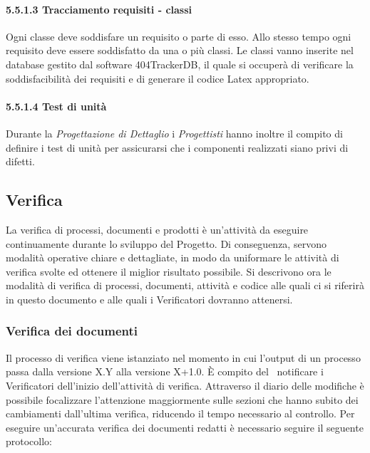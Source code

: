 \paragraph{5.5.1.3 Tracciamento requisiti - classi \\}
Ogni classe deve soddisfare un requisito o parte di esso. Allo stesso tempo ogni requisito deve essere soddisfatto da una o più classi.
Le classi vanno inserite nel database gestito dal software 404TrackerDB, il quale si occuperà di verificare la soddisfacibilità dei requisiti e di generare il codice {Latex} appropriato.

\paragraph{5.5.1.4 Test di unità \\}
Durante la \textit{Progettazione di Dettaglio} i \textit{Progettisti} hanno inoltre il compito di definire i test di unità per assicurarsi che i componenti realizzati siano privi di difetti.

\subsection{Verifica}

La verifica di processi, documenti e prodotti è un'attività da eseguire continuamente
durante lo sviluppo del Progetto. Di conseguenza, servono modalità operative chiare
e dettagliate, in modo da uniformare le attività di verifica svolte ed
ottenere il miglior risultato possibile. Si descrivono ora le modalità di verifica di processi, documenti, attività e codice alle quali ci si riferirà in questo
documento e alle quali i Verificatori dovranno attenersi.

\subsubsection{Verifica dei documenti}
Il processo di verifica viene istanziato nel momento in cui l'output di un processo passa
dalla versione X.Y alla versione X+1.0. È compito del \ruoloResponsabile\ notificare i Verificatori dell'inizio dell'attività di verifica. Attraverso il diario delle modifiche è
possibile focalizzare l'attenzione maggiormente sulle sezioni che hanno subito dei cambiamenti dall'ultima verifica, riducendo il tempo necessario al controllo.
Per eseguire un'accurata verifica dei documenti redatti è necessario seguire il seguente
protocollo:


